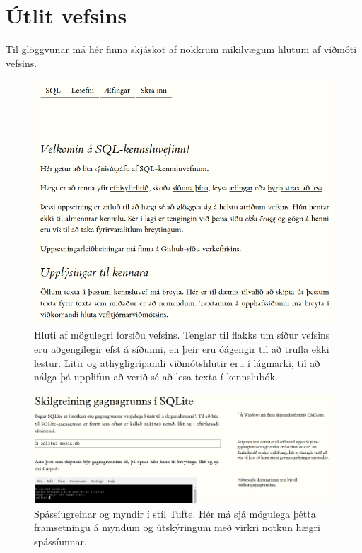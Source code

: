 \documentclass[a4paper,12pt,twoside,BCOR=10mm]{scrbook}
\begin{document}



\appendix
\renewcommand{\chaptername}{Appendix}

\chapter{Útlit vefsins}
Til glöggvunar má hér finna skjáskot af nokkrum mikilvægum hlutum af viðmóti vefsins.

\begin{figure}[h]
\caption[Forsíða vefsins]{Hluti af mögulegri forsíðu vefsins. Tenglar til flakks um síður vefsins eru aðgengilegir efst á síðunni, en þeir eru óágengir til að trufla ekki lestur. Litir og athygligrípandi viðmótshlutir eru í lágmarki, til að nálga þá upplifun að verið sé að lesa texta í kennslubók.}
\label{fig:index-page}
\begin{center}
\includegraphics[width=\textwidth]{mv-adal}
\end{center}
\end{figure}

\begin{figure}
\caption[Spássíugreinar og myndir í stíl Tufte]{Spássíugreinar og myndir í stíl Tufte. Hér má sjá mögulega þétta framsetningu á myndum og útskýringum með virkri notkun hægri spássíunnar.}
\label{fig:tufte-example}
\includegraphics[width=\textwidth]{mv-tufte-example}
\end{figure}
\end{document}
